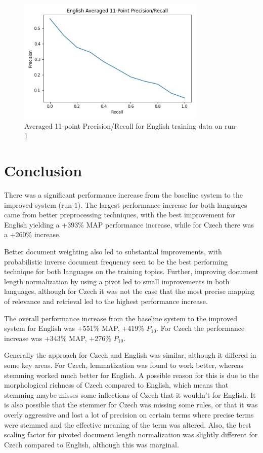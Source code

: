 \documentclass[a4paper]{article}
\begin{document}
\begin{figure}[htpb]
	\centering
	\includegraphics[width=0.8\textwidth]{plot_run-1_en_precision_recall.jpg}
	\caption{Averaged 11-point Precision/Recall for English training data on run-1}
	\label{fig:en_train_run_1}
\end{figure}

\section{Conclusion}
There was a significant performance increase from the baseline system to the
improved system (run-1). The largest performance increase for both languages
came from better preprocessing techniques, with the best improvement for English
yielding a +393\% MAP performance increase, while for Czech there was a +260\%
increase.

Better document weighting also led to substantial improvements, with
probabilistic inverse document frequency seen to be the best performing
technique for both languages on the training topics. Further, improving
document length normalization by using a pivot led to small improvements in both
languages, although for Czech it was not the case that the most precise mapping
of relevance and retrieval led to the highest performance increase.

The overall performance increase from the baseline system to the improved
system for English was +551\% MAP, +419\% $P_{10}$. For Czech the performance
increase was +343\% MAP, +276\% $P_{10}$.

Generally the approach for Czech and English was similar, although it differed
in some key areas. For Czech, lemmatization was found to work better, whereas
stemming worked much better for English. A possible reason for this is due to
the morphological richness of Czech compared to English, which means that
stemming maybe misses some inflections of Czech that it wouldn't for English.
It is also possible that the stemmer for Czech was missing some rules, or that
it was overly aggressive and lost a lot of precision on certain terms where
precise terms were stemmed and the effective meaning of the term was altered.
Also, the best scaling factor for pivoted document length normalization was
slightly different for Czech compared to English, although this was marginal.
\end{document}
